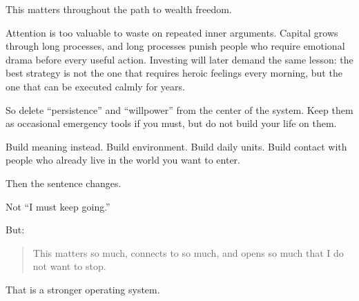This matters throughout the path to wealth freedom.

Attention is too valuable to waste on repeated inner arguments. Capital grows through long processes, and long processes punish people who require emotional drama before every useful action. Investing will later demand the same lesson: the best strategy is not the one that requires heroic feelings every morning, but the one that can be executed calmly for years.

So delete ``persistence'' and ``willpower'' from the center of the system. Keep them as occasional emergency tools if you must, but do not build your life on them.

Build meaning instead. Build environment. Build daily units. Build contact with people who already live in the world you want to enter.

Then the sentence changes.

Not ``I must keep going.''

But:

\begin{quote}
This matters so much, connects to so much, and opens so much that I do not want to stop.
\end{quote}

That is a stronger operating system.
